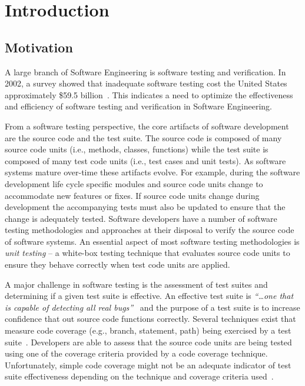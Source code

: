 \chapter{Introduction}
\label{chap:introduction}


\section{Motivation}
\label{sec:introduction_motivation}
A large branch of Software Engineering is software testing and verification. In 2002, a survey showed that inadequate software testing cost the United States approximately \$59.5 billion~\cite{RTI02}. This indicates a need to optimize the effectiveness and efficiency of software testing and verification in Software Engineering.

From a software testing perspective, the core artifacts of software development are the source code and the test suite. The source code is composed of many source code units (i.e., methods, classes, functions) while the test suite is composed of many test code units (i.e., test cases and unit tests). As software systems mature over-time these artifacts evolve. For example, during the software development life cycle specific modules and source code units change to accommodate new features or fixes. If source code units change during development the accompanying tests must also be updated to ensure that the change is adequately tested. Software developers have a number of software testing methodologies and approaches at their disposal to verify the source code of software systems. An essential aspect of most software testing methodologies is \emph{unit testing} -- a white-box testing technique that evaluates source code units to ensure they behave correctly when test code units are applied.

A major challenge in software testing is the assessment of test suites and determining if a given test suite is effective. An effective test suite is \emph{``\ldots one that is capable of detecting all real bugs''}~\cite{Wey93} and the purpose of a test suite is to increase confidence that out source code functions correctly. Several techniques exist that measure code coverage (e.g., branch, statement, path) being exercised by a test suite~\cite{ZHM97}. Developers are able to assess that the source code units are being tested using one of the coverage criteria provided by a code coverage technique. Unfortunately, simple code coverage might not be an adequate indicator of test suite effectiveness depending on the technique and coverage criteria used~\cite{NA09,GJ08}.

